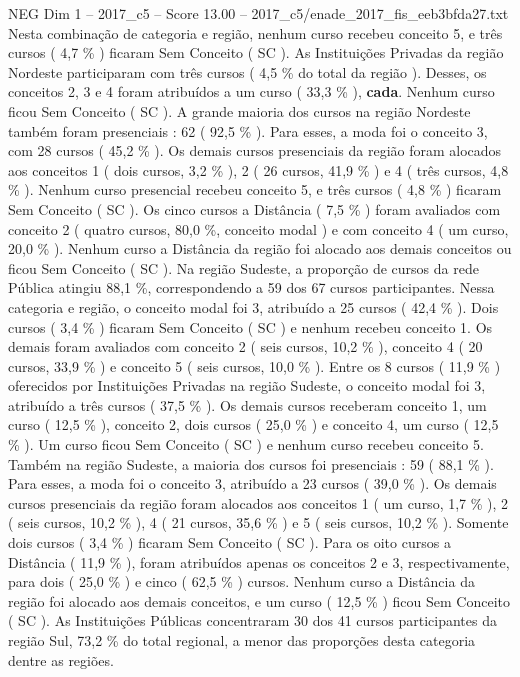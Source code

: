 \begin{textsample}{NEG Dim 1 – 2017\_c5 – Score 13.00 – 2017\_c5/enade\_2017\_fis\_eeb3bfda27.txt}
Nesta combinação de categoria e região, nenhum curso recebeu conceito 5, e três cursos ( 4,7 \% ) ficaram Sem Conceito ( SC ).
As Instituições Privadas da região Nordeste participaram com três cursos ( 4,5 \% do total da região ).
Desses, os conceitos 2, 3 e 4 foram atribuídos a um curso ( 33,3 \% ), \textbf{cada}.
Nenhum curso ficou Sem Conceito ( SC ).
A grande maioria dos cursos na região Nordeste também foram presenciais : 62 ( 92,5 \% ).
Para esses, a moda foi o conceito 3, com 28 cursos ( 45,2 \% ).
Os demais cursos presenciais da região foram alocados aos conceitos 1 ( dois cursos, 3,2 \% ), 2 ( 26 cursos, 41,9 \% ) e 4 ( três cursos, 4,8 \% ).
Nenhum curso presencial recebeu conceito 5, e três cursos ( 4,8 \% ) ficaram Sem Conceito ( SC ).
Os cinco cursos a Distância ( 7,5 \% ) foram avaliados com conceito 2 ( quatro cursos, 80,0 \%, conceito modal ) e com conceito 4 ( um curso, 20,0 \% ).
Nenhum curso a Distância da região foi alocado aos demais conceitos ou ficou Sem Conceito ( SC ).
Na região Sudeste, a proporção de cursos da rede Pública atingiu 88,1 \%, correspondendo a 59 dos 67 cursos participantes.
Nessa categoria e região, o conceito modal foi 3, atribuído a 25 cursos ( 42,4 \% ).
Dois cursos ( 3,4 \% ) ficaram Sem Conceito ( SC ) e nenhum recebeu conceito 1.
Os demais foram avaliados com conceito 2 ( seis cursos, 10,2 \% ), conceito 4 ( 20 cursos, 33,9 \% ) e conceito 5 ( seis cursos, 10,0 \% ).
Entre os 8 cursos ( 11,9 \% ) oferecidos por Instituições Privadas na região Sudeste, o conceito modal foi 3, atribuído a três cursos ( 37,5 \% ).
Os demais cursos receberam conceito 1, um curso ( 12,5 \% ), conceito 2, dois cursos ( 25,0 \% ) e conceito 4, um curso ( 12,5 \% ).
Um curso ficou Sem Conceito ( SC ) e nenhum curso recebeu conceito 5.
Também na região Sudeste, a maioria dos cursos foi presenciais : 59 ( 88,1 \% ).
Para esses, a moda foi o conceito 3, atribuído a 23 cursos ( 39,0 \% ).
Os demais cursos presenciais da região foram alocados aos conceitos 1 ( um curso, 1,7 \% ), 2 ( seis cursos, 10,2 \% ), 4 ( 21 cursos, 35,6 \% ) e 5 ( seis cursos, 10,2 \% ).
Somente dois cursos ( 3,4 \% ) ficaram Sem Conceito ( SC ).
Para os oito cursos a Distância ( 11,9 \% ), foram atribuídos apenas os conceitos 2 e 3, respectivamente, para dois ( 25,0 \% ) e cinco ( 62,5 \% ) cursos.
Nenhum curso a Distância da região foi alocado aos demais conceitos, e um curso ( 12,5 \% ) ficou Sem Conceito ( SC ).
As Instituições Públicas concentraram 30 dos 41 cursos participantes da região Sul, 73,2 \% do total regional, a menor das proporções desta categoria dentre as regiões.

\end{textsample}
